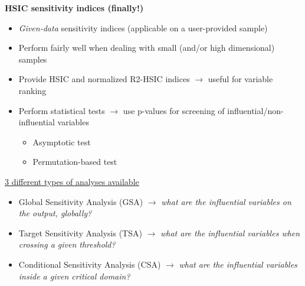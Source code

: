 \documentclass[aspectratio=169]{beamer}
\begin{document}
\begin{frame}
\begin{small}

\textbf{HSIC sensitivity indices (finally!)}

\begin{itemize}
\item \emph{Given-data} sensitivity indices (applicable on a user-provided sample)
\item Perform fairly well when dealing with small (and/or high dimensional) samples
\item Provide HSIC and normalized R2-HSIC indices $\rightarrow$ useful  for variable ranking
\item Perform statistical tests $\rightarrow$ use p-values for screening of influential/non-influential variables
\begin{itemize}
\item Asymptotic test
\item Permutation-based test
\end{itemize}
\end{itemize}

\vspace{12pt}

\underline{3 different types of analyses available}

\begin{itemize}
\item Global Sensitivity Analysis (GSA) $\rightarrow$ \emph{what are the influential variables on the output, globally?}
\item Target Sensitivity Analysis (TSA) $\rightarrow$ \emph{what are the influential variables when crossing a given threshold?}
\item Conditional Sensitivity Analysis (CSA) $\rightarrow$ \emph{what are the influential variables inside a given critical domain?}
\end{itemize}

\end{small}
\end{frame}
\end{document}
